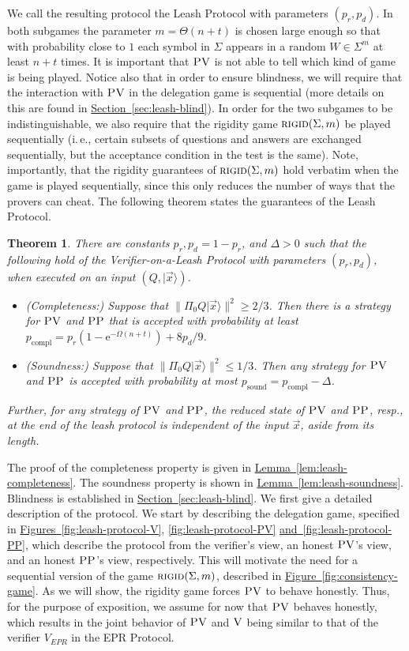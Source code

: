 \documentclass[11pt]{article}
\numberwithin{equation}{section}
\newtheorem{theorem}{Theorem}[section]
\theoremstyle{definition}
\theoremstyle{plain}
\newcommand{\eee}{\mathrm e}
\newcommand{\ie}{i.\,e.}
\newcommand{\expref}[2]{\hyperref[#2]{#1~\ref{#2}}}
\newcommand{\ket}[1]{|#1\rangle}
\DeclareMathOperator{\sound}{sound}
\DeclareMathOperator{\compl}{compl}
\newcommand{\rigid}{\textsc{rigid}}
\newcommand{\ver}{\textsc{V}}
\newcommand{\pv}{\textsc{PV}}
\newcommand{\pp}{\textsc{PP}}
\begin{document}
We call the resulting protocol the Leash Protocol with parameters $(p_r,p_d)$. In both subgames the parameter $m=\Theta(n+t)$ is chosen large enough so that with probability close to $1$ each symbol in $\Sigma$ appears in a random $W\in \Sigma^m$ at least $n+t$ times. It is important that $\pv$ is not able to tell which kind of game is being played. Notice also that in order to ensure blindness, we will require that the interaction with $\pv$ in the delegation game is sequential (more details on this are found in \expref{Section}{sec:leash-blind}). In order for the two subgames to be indistinguishable, we also require that the rigidity game $\rigid(\Sigma,m)$ be played sequentially (\ie, certain subsets of questions and answers are exchanged sequentially, but the acceptance condition in the test is the same). Note, importantly, that the rigidity guarantees of $\rigid(\Sigma,m)$ hold verbatim when the game is played sequentially, since this only reduces the number of ways that the provers can cheat. The following theorem states the guarantees of the Leash Protocol.


\begin{theorem}\label{thm:leash}
There are constants $p_r,p_d=1-p_r$, and $\Delta>0$ such that the following hold of the Verifier-on-a-Leash Protocol with parameters $(p_r,p_d)$, when executed on an input $(Q,\ket{\vec{x}})$.
\begin{itemize}
\item \emph{(Completeness:)} Suppose that $\|\Pi_0 Q\ket{\vec{x}}\|^2 \geq 2/3$. Then there is a strategy for $\pv$ and $\pp$ that is accepted with probability at least $p_{\compl} = p_r(1-\eee^{-\Omega(n+t)})+8p_d/9$. 
\item \emph{(Soundness:)} Suppose that $\|\Pi_0 Q\ket{\vec{x}}\|^2 \leq 1/3$. Then any strategy for $\pv$ and $\pp$ is accepted with probability at most $p_{\sound} = p_{\compl} - \Delta$. 
\end{itemize}
Further, for any strategy of $\pv$ and $\pp$, the reduced state of $\pv$
%
and $\pp$, resp.,  %
at the end of the leash protocol is independent of the input $\vec{x}$, 
aside from its length.
\end{theorem}




The proof of the completeness property is given in \expref{Lemma}{lem:leash-completeness}. The soundness property is shown in \expref{Lemma}{lem:leash-soundness}. Blindness is established in \expref{Section}{sec:leash-blind}. 
We first give a detailed description of the protocol. We start by describing the delegation game, specified in \expref{Figures}{fig:leash-protocol-V}, \ref{fig:leash-protocol-PV} \expref{and}{fig:leash-protocol-PP}, which describe the protocol from the verifier's view, an honest $\pv$'s view, and an honest $\pp$'s
view, respectively. %
This will motivate the need for a sequential version of the game $\rigid(\Sigma,m)$, described in \expref{Figure}{fig:consistency-game}. As we will show, the rigidity game forces $\pv$ to behave honestly. Thus, for the purpose of exposition, we assume for now that $\pv$ behaves honestly, which results in the joint behavior of $\pv$ and $\ver$ being similar to that of the verifier $V_{EPR}$ in the EPR Protocol. 
\end{document}
